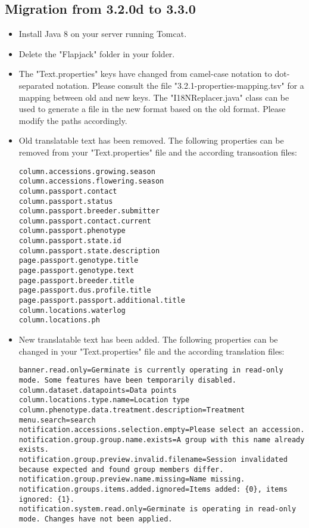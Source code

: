 \subsection{Migration from 3.2.0d to 3.3.0}
\begin{itemize}
	\item Install Java 8 on your server running Tomcat.
	\item Delete the "Flapjack" folder in your  folder.
	\item The "Text.properties" keys have changed from camel-case notation to dot-separated notation. Please consult the file "3.2.1-properties-mapping.tsv" for a mapping between old and new keys. The "I18NReplacer.java" class can be used to generate a file in the new format based on the old format. Please modify the paths accordingly.
	\item Old translatable text has been removed. The following properties can be removed from your "Text.properties" file and the according transoation files:
	\begin{lstlisting}[style=Properties]
column.accessions.growing.season
column.accessions.flowering.season
column.passport.contact
column.passport.status
column.passport.breeder.submitter
column.passport.contact.current
column.passport.phenotype
column.passport.state.id
column.passport.state.description
page.passport.genotype.title
page.passport.genotype.text
page.passport.breeder.title
page.passport.dus.profile.title
page.passport.passport.additional.title
column.locations.waterlog
column.locations.ph
	\end{lstlisting}
	\item New translatable text has been added. The following properties can be changed in your "Text.properties" file and the according translation files:
	\begin{lstlisting}[style=Properties]
banner.read.only=Germinate is currently operating in read-only mode. Some features have been temporarily disabled.
column.dataset.datapoints=Data points
column.locations.type.name=Location type
column.phenotype.data.treatment.description=Treatment
menu.search=search
notification.accessions.selection.empty=Please select an accession.
notification.group.group.name.exists=A group with this name already exists.
notification.group.preview.invalid.filename=Session invalidated because expected and found group members differ.
notification.group.preview.name.missing=Name missing.
notification.groups.items.added.ignored=Items added: {0}, items ignored: {1}.
notification.system.read.only=Germinate is operating in read-only mode. Changes have not been applied.

\end{lstlisting}
\end{itemize}
